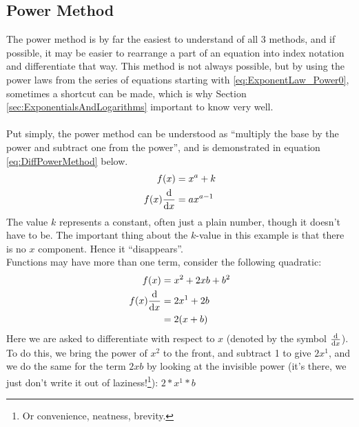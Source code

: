 \subsection{Power Method}
\label{sec:PowerMethod}
The power method is by far the easiest to understand of all 3 methods, and if
possible, it may be easier to rearrange a part of an equation into index
notation and differentiate that way. This method is not always possible,
but by using the power laws from the series of equations starting with
\ref{eq:ExponentLaw_Power0}, sometimes a shortcut can be made, which is why
Section \ref{sec:ExponentialsAndLogarithms} important to know very well.\\
\\
Put simply, the power method can be understood as ``multiply the base by the
power and subtract one from the power'', and is demonstrated in equation
\ref{eq:DiffPowerMethod} below.
\begin{align}
  f(x) & =   {x}^{a} + k \label{eq:DiffPowerMethodKValue} \\
  f(x)\frac{\mathrm{d}}{\mathrm{d}x} & =   a{x}^{a-1} \label{eq:DiffPowerMethod}
\end{align}
The value $k$ represents a constant, often just a plain number, though it
doesn't have to be. The important thing about the $k$-value in this example is
that there is no $x$ component. Hence it ``disappears''.\\
Functions may have more than one term, consider the following quadratic:
\begin{align}
  f(x)            & = {x}^{2} + 2xb + {b}^{2} \\
  f(x)\frac{\mathrm{d}}{\mathrm{d}x} & = 2{x}^{1} + 2b \\
                  & = 2(x+b) \label{eq:DiffPowerMethodRespectTo}
\end{align}
Here we are asked to differentiate with respect to $x$ (denoted by the symbol
$\frac{\mathrm{d}}{\mathrm{d}x}$). To do this, we bring the power of ${x}^{2}$ to the front, and
subtract 1 to give $2{x}^{1}$, and we do the same for the term ${2xb}$ by
looking at the invisible power (it's there, we just don't write it out of
laziness!\footnote{Or convenience, neatness, brevity.}): $2*{x}^{1}*b$

